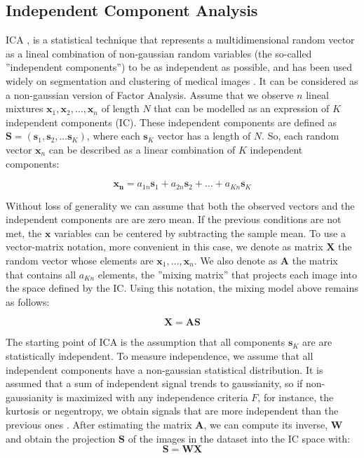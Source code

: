 \subsection{Independent Component Analysis}
\cite{Martinez-Murcia2013255,Martinez-Murcia201458}

\acf{ICA} \cite{Hyvarinen2000}, is a statistical technique that represents a multidimensional random vector as a lineal combination of non-gaussian random variables (the so-called ''independent components'') to be as independent as possible, and has been used widely on segmentation and clustering of medical images \cite{DeMartino2007,Alvarez2009}. It can be considered as a non-gaussian version of Factor Analysis. Assume that we observe $n$ lineal mixtures $\mathbf{x}_1, \mathbf{x}_2, \ldots, \mathbf{x}_n$ of length $N$ that can be modelled as an expression of $K$ independent components (IC). These independent components are defined as $\mathbf{S} = (\mathbf{s}_1, \mathbf{s}_2, ... \mathbf{s}_K)$, where each $\mathbf{s}_K$ vector has a length of $N$. So, each random vector $\mathbf{x}_n$ can be described as a linear combination of $K$ independent components: 

\begin{equation}
\mathbf{x_n} = a_{1n}\mathbf{s}_1 + a_{2n}\mathbf{s}_2 + \ldots + a_{Kn}\mathbf{s}_K
\end{equation}

Without loss of generality we can assume that both the observed vectors and the independent components are are zero mean. If the previous conditions are not met, the $\mathbf{x}$ variables can be centered by subtracting the sample mean. To use a vector-matrix notation, more convenient in this case, we denote as matrix $\mathbf{X}$ the random vector whose elements are $\mathbf{x}_1, \ldots, \mathbf{x}_n$. We also denote as $\mathbf{A}$ the matrix that contains all $a_{Kn}$ elements, the ''mixing matrix'' that projects each image into the space defined by the IC. Using this notation, the mixing model above remains as follows: 

\begin{equation}\label{eq:ica}
\mathbf{X}=\mathbf{A}\mathbf{S}
\end{equation}

The starting point of ICA is the assumption that all components $\mathbf{s}_K$ are are statistically independent. To measure independence, we assume that all independent components have a non-gaussian statistical distribution. It is assumed that a sum of independent signal trends to gaussianity, so if non-gaussianity is maximized with any independence criteria $F$, for instance, the kurtosis or negentropy, we obtain signals that are more independent than the previous ones \cite{Hyvarinen1999,Hyvarinen2000}.
After estimating the matrix $\mathbf{A}$, we can compute its inverse, $\mathbf{W}$ and obtain the projection $\mathbf{S}$ of the images in the dataset into the IC space with: 
\begin{equation}
\mathbf{S} = \mathbf{W}\mathbf{X}
\end{equation}

